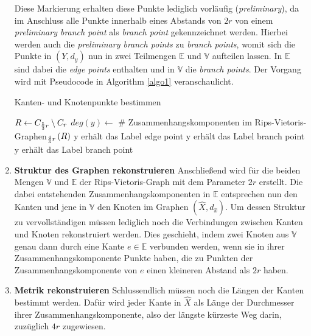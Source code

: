 \documentclass[parskip=half,
 fontsize=12pt, bibtotoc,
 titlepage, ngerman]
 {article}
\begin{document}
\begin{enumerate}
Diese Markierung erhalten diese Punkte lediglich vorläufig (\textit{preliminary}), da im Anschluss alle Punkte innerhalb eines Abstands von $2r$ von einem \textit{preliminary branch point} als \textit{branch point} gekennzeichnet werden. Hierbei werden auch die \textit{preliminary branch points} zu \textit{branch points}, womit sich die Punkte in $\left(Y, d_y\right)$ nun in zwei Teilmengen $\mathbb{E}$ und $\mathbb{V}$ aufteilen lassen. In $\mathbb{E}$ sind dabei die \textit{edge points} enthalten und in $\mathbb{V}$ die \textit{branch points}. Der Vorgang wird mit Pseudocode in Algorithm \ref{algo1} veranschaulicht. \newline
\begin{algorithm}
\caption{Kanten- und Knotenpunkte bestimmen}\label{algo1}
\begin{algorithmic}
\STATE $R \leftarrow C_{{5\over 3}r} \setminus C_r$ 
\STATE $deg\left(y\right) \leftarrow$ \# Zusammenhangskomponenten im Rips-Vietoris-Graphen$_{{4 \over 3}r}\left(R\right)$
		\STATE y erhält das Label edge point
	\ELSE 
		\STATE y erhält das Label branch point
	\ENDIF
\ENDFOR
{}
		\STATE y erhält das Label branch point
	\ENDIF
\ENDFOR
\end{algorithmic}
\end{algorithm}
\item \textbf{Struktur des Graphen rekonstruieren}\newline
Anschlie{\ss}end wird für die beiden Mengen $\mathbb{V}$ und $\mathbb{E}$ der Rips-Vietoris-Graph mit dem Parameter $2r$ erstellt. Die dabei entstehenden Zusammenhangskomponenten in $\mathbb{E}$ entsprechen nun den Kanten und jene in $\mathbb{V}$ den Knoten im Graphen $(\hat{X}, d_{\hat{x}})$. Um dessen Struktur zu vervollständigen müssen lediglich noch die Verbindungen zwischen Kanten und Knoten rekonstruiert werden. Dies geschieht, indem zwei Knoten aus  $\mathbb{V}$ genau dann durch eine Kante $e \in \mathbb{E}$ verbunden werden, wenn sie in ihrer Zusammenhangskomponente Punkte haben, die zu Punkten der Zusammenhangskomponente von $e$ einen kleineren Abstand als $2r$ haben.

\item \textbf{Metrik rekonstruieren}\newline
Schlussendlich müssen noch die Längen der Kanten bestimmt werden. Dafür wird jeder Kante in $\hat{X}$ als Länge der Durchmesser ihrer Zusammenhangskomponente, also der längste kürzeste Weg darin, zuzüglich $4r$ zugewiesen.
\end{enumerate} 
\end{document}
